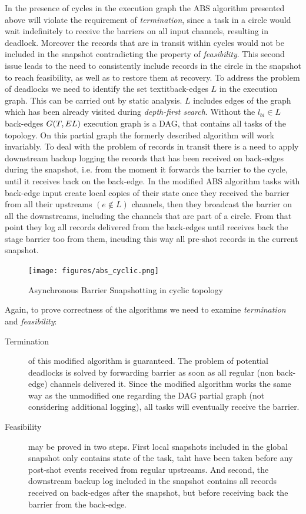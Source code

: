 \cite{abs}
In the presence of cycles in the execution graph the ABS algorithm presented above will violate the requirement of \textit{termination}, since a task in a circle would wait indefinitely to receive the barriers on all input channels, resulting in deadlock. Moreover the records that are in transit within cycles would not be included in the snapshot contradicting the property of \textit{feasibility}. This second issue leads to the need to consistently include records in the circle in the snapshot to reach feasibility, as well as to restore them at recovery.
To address the problem of deadlocks we need to identify the set textit{back-edges} $L$  in the execution graph. This can be carried out by static analysis. $L$ includes edges of the graph which has been already visited during \textit{depth-first search}. Without the $l_{bi} \in L$ back-edges $G(T, E\\L)$ execution graph is a DAG, that contains all tasks of the topology. On this partial graph the formerly described algorithm will work invariably. To deal with the problem of records in transit there is a need to apply downstream backup logging the records that has been received on back-edges during the snapshot, i.e. from the moment it forwards the barrier to the cycle,  until it receives back on the back-edge.      
In the modified ABS algorithm  tasks with back-edge input create local copies of their state once they received the barrier from all their upstreams $(e \notin L)$ channels, then they broadcast the barrier on all the downstreams, including the channels that are part of a circle. From that point they log all records delivered from the back-edges until receives back the stage barrier too from them, incuding this way all pre-shot records in the current snapshot.  
\begin{figure}[!ht]
  \centering    
      \texttt{[image: figures/abs\_cyclic.png]}
  \caption{Asynchronous Barrier Snapshotting in cyclic topology\cite{abs}}
  \label{fig:abs_cyclic}
\end{figure}
Again, to prove correctness of the algorithms we need to examine \textit{termination} and \textit{feasibility}:
\begin{description}

\item[Termination] of this modified algorithm is guaranteed. The problem of potential deadlocks is solved by forwarding barrier as soon as all regular (non back-edge) channels delivered it. Since the modified algorithm works the same way as the unmodified one regarding the DAG partial graph (not considering additional logging), all tasks will eventually receive the barrier.
\item[Feasibility] may be proved in two steps. First local snapshots included in the global snapshot only contains state of the task, taht have been taken before any post-shot events received from regular upstreams. And second, the downstream backup log included in the snapshot contains all records received on back-edges after the snapshot, but before receiving back the barrier from the back-edge.
\end{description} 
\cite{abs}

